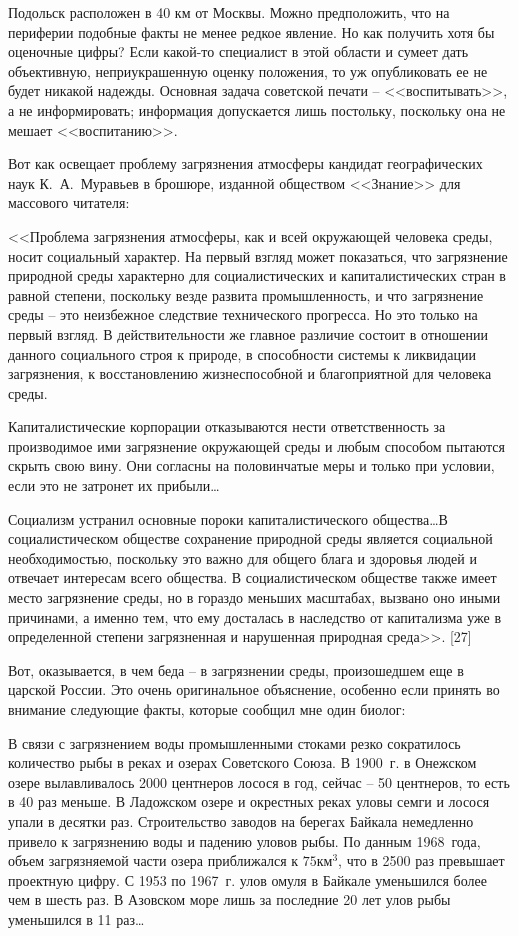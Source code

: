 \documentclass{book}
\begin{document}
Подольск расположен в 40 км от Москвы. Можно предположить, что на периферии подобные факты не менее редкое явление. Но как 
получить хотя бы оценочные цифры? Если какой-то специалист в этой области и сумеет дать объективную, неприукрашенную оценку 
положения, то уж опубликовать ее не будет никакой надежды. Основная задача советской печати -- <<воспитывать>>, а не 
информировать; информация допускает­ся лишь постольку, поскольку она не мешает <<воспитанию>>.

Вот как освещает проблему загрязнения атмосферы кандидат географических наук К.~А.~Муравьев в брошюре, изданной обществом 
<<Знание>> для массового читателя:

<<Проблема загрязнения атмосферы, как и всей окружающей человека среды, носит социальный характер. На первый взгляд может 
показаться, что загрязнение природной среды характерно для социалистических и капиталистических стран в равной степени, 
поскольку везде развита промышленность, и что загрязнение среды -- это неизбежное следствие технического прогресса. Но это 
только на первый взгляд. В действительности же главное различие состоит в отношении данного социального строя к природе, в 
способности системы к ликвидации загрязнения, к восстановлению жизнеспособной и благоприятной для человека среды.

Капиталистические корпорации отказываются нести ответственность за производимое ими загрязнение окружающей среды и любым 
способом пытаются скрыть свою вину. Они согласны на половинчатые меры и только при условии, если это не затронет их 
прибыли\ldots

Социализм устранил основные пороки капиталистического общества\ldots В социалистическом обществе сохранение природной среды 
является социальной необходимостью, поскольку это важно для общего блага и здоровья людей и отвечает инте­ресам всего общества. В 
социалистическом обществе также имеет место загрязнение среды, но в гораздо меньших масштабах, вызвано оно иными причинами, а 
именно тем, что ему досталась в наследство от капитализма уже в определенной степени загрязненная и нарушенная природная 
среда>>. [27]

Вот, оказывается, в чем беда -- в загрязнении среды, прои­зошедшем еще в царской России. Это очень оригинальное объяснение, 
особенно если принять во внимание следующие факты, которые сообщил мне один биолог:

В связи с загрязнением воды промышленными стоками резко сократилось количество рыбы в реках и озерах Советского Союза. В 1900~г. 
в Онежском озере вылавливалось 2000 центнеров лосося в год, сейчас -- 50 центнеров, то есть в 40 раз меньше. В Ладожском озере и 
окрестных реках уловы семги и лосося упали в десятки раз. Строительство заводов на берегах Байкала немедленно привело к 
загрязнению воды и падению уловов рыбы. По данным 1968~года, объем загрязняемой части озера приближался к $75 \text{км}^3$, что в 2500 раз 
превышает проектную цифру. С 1953 по 1967~г. улов омуля в Байкале уменьшился более чем в шесть раз. В Азовском море лишь за 
последние 20 лет улов рыбы уменьшился в 11 раз\ldots
\end{document}
